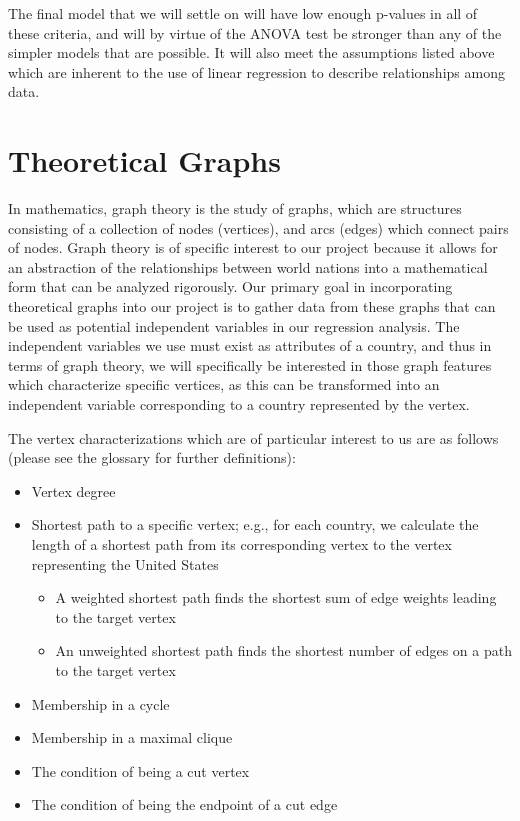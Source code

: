 \documentclass[oneside,12pt]{report}
\begin{document}
The final model that we will settle on will have low enough p-values in all of these criteria, and will by virtue of the ANOVA test be stronger than any of the simpler models that are possible. It will also meet the assumptions listed above which are inherent to the use of linear regression to describe relationships among data.

\section*{Theoretical Graphs}

In mathematics, graph theory is the study of graphs, which are structures consisting of a collection of nodes (vertices), and arcs (edges) which connect pairs of nodes. Graph theory is of specific interest to our project because it allows for an abstraction of the relationships between world nations into a mathematical form that can be analyzed rigorously. Our primary goal in incorporating theoretical graphs into our project is to gather data from these graphs that can be used as potential independent variables in our regression analysis. The independent variables we use must exist as attributes of a country, and thus in terms of graph theory, we will specifically be interested in those graph features which characterize specific vertices, as this can be transformed into an independent variable corresponding to a country represented by the vertex.

The vertex characterizations which are of particular interest to us are as follows (please see the glossary for further definitions):
\begin{itemize}
\item Vertex degree
\item Shortest path to a specific vertex; e.g., for each country, we calculate the length of a shortest path from its corresponding vertex to the vertex representing the United States
\begin{itemize}
\item A weighted shortest path finds the shortest sum of edge weights leading to the target vertex
\item An unweighted shortest path finds the shortest number of edges on a path to the target vertex
\end{itemize}
\item Membership in a cycle
\item Membership in a maximal clique
\item The condition of being a cut vertex
\item The condition of being the endpoint of a cut edge
\end{itemize}
\end{document}

